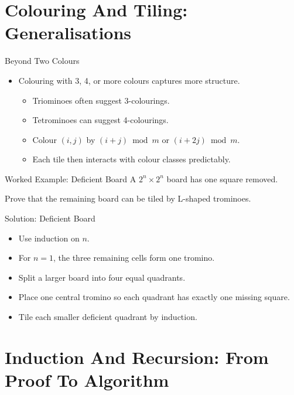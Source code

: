 \documentclass{beamer}
\begin{document}
\section{Colouring And Tiling: Generalisations}

\begin{frame}{Beyond Two Colours}
    \pause
    \begin{itemize}
        \item Colouring with 3, 4, or more colours captures more structure.
            \begin{itemize}
                \item Triominoes often suggest 3-colourings.
                \item Tetrominoes can suggest 4-colourings.
                \item Colour $(i,j)$ by $(i+j)\bmod m$ or
                    $(i+2j)\bmod m$.
                \item Each tile then interacts with colour classes predictably.
            \end{itemize}
    \end{itemize}
\end{frame}

\begin{frame}{Worked Example: Deficient Board}
    A $2^n\times2^n$ board has one square removed.

    Prove that the remaining board can be tiled by L-shaped trominoes.
\end{frame}

\begin{frame}{Solution: Deficient Board}
    \pause
    \begin{itemize}
        \item Use induction on $n$.
        \item For $n=1$, the three remaining cells form one tromino.
        \item Split a larger board into four equal quadrants.
        \item Place one central tromino so each quadrant has exactly
            one missing square.
        \item Tile each smaller deficient quadrant by induction.
    \end{itemize}
\end{frame}

\section{Induction And Recursion: From Proof To Algorithm}
\end{document}
